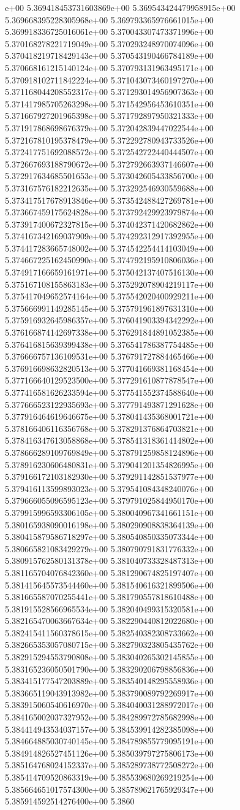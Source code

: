 e+00	5.369418453731603869e+00	5.369543424479958915e+00	5.369668395228305968e+00	5.369793365976661015e+00	5.369918336725016061e+00	5.370043307473371996e+00	5.370168278221719049e+00	5.370293248970074096e+00	5.370418219718429143e+00	5.370543190466784189e+00	5.370668161215140124e+00	5.370793131963495171e+00	5.370918102711842224e+00	5.371043073460197270e+00	5.371168044208552317e+00	5.371293014956907363e+00	5.371417985705263298e+00	5.371542956453610351e+00	5.371667927201965398e+00	5.371792897950321333e+00	5.371917868698676379e+00	5.372042839447022544e+00	5.372167810195378479e+00	5.372292780943733526e+00	5.372417751692088572e+00	5.372542722440444507e+00	5.372667693188790672e+00	5.372792663937146607e+00	5.372917634685501653e+00	5.373042605433856700e+00	5.373167576182212635e+00	5.373292546930559688e+00	5.373417517678913846e+00	5.373542488427269781e+00	5.373667459175624828e+00	5.373792429923979874e+00	5.373917400672327815e+00	5.374042371420682862e+00	5.374167342169037909e+00	5.374292312917392955e+00	5.374417283665748002e+00	5.374542254414103049e+00	5.374667225162450990e+00	5.374792195910806036e+00	5.374917166659161971e+00	5.375042137407516130e+00	5.375167108155863183e+00	5.375292078904219117e+00	5.375417049652574164e+00	5.375542020400929211e+00	5.375666991149285145e+00	5.375791961897631310e+00	5.375916932645986357e+00	5.376041903394342292e+00	5.376166874142697338e+00	5.376291844891052385e+00	5.376416815639399438e+00	5.376541786387754485e+00	5.376666757136109531e+00	5.376791727884465466e+00	5.376916698632820513e+00	5.377041669381168454e+00	5.377166640129523500e+00	5.377291610877878547e+00	5.377416581626233594e+00	5.377541552374588640e+00	5.377666523122935693e+00	5.377791493871291628e+00	5.377916464619646675e+00	5.378041435368001721e+00	5.378166406116356768e+00	5.378291376864703821e+00	5.378416347613058868e+00	5.378541318361414802e+00	5.378666289109769849e+00	5.378791259858124896e+00	5.378916230606480831e+00	5.379041201354826995e+00	5.379166172103182930e+00	5.379291142851537977e+00	5.379416113599893023e+00	5.379541084348240076e+00	5.379666055096595123e+00	5.379791025844950170e+00	5.379915996593306105e+00	5.380040967341661151e+00	5.380165938090016198e+00	5.380290908838364139e+00	5.380415879586718297e+00	5.380540850335073344e+00	5.380665821083429279e+00	5.380790791831776332e+00	5.380915762580131378e+00	5.381040733328487313e+00	5.381165704076842360e+00	5.381290674825197407e+00	5.381415645573544460e+00	5.381540616321899506e+00	5.381665587070255441e+00	5.381790557818610488e+00	5.381915528566965534e+00	5.382040499315320581e+00	5.382165470063667634e+00	5.382290440812022680e+00	5.382415411560378615e+00	5.382540382308733662e+00	5.382665353057080715e+00	5.382790323805435762e+00	5.382915294553790808e+00	5.383040265302145855e+00	5.383165236050501790e+00	5.383290206798856836e+00	5.383415177547203889e+00	5.383540148295558936e+00	5.383665119043913982e+00	5.383790089792269917e+00	5.383915060540616970e+00	5.384040031288972017e+00	5.384165002037327952e+00	5.384289972785682998e+00	5.384414943534037157e+00	5.384539914282385098e+00	5.384664885030740145e+00	5.384789855779095191e+00	5.384914826527451126e+00	5.385039797275806173e+00	5.385164768024152337e+00	5.385289738772508272e+00	5.385414709520863319e+00	5.385539680269219254e+00	5.385664651017574300e+00	5.385789621765929347e+00	5.385914592514276400e+00	5.3860